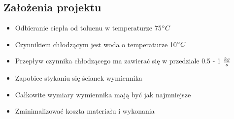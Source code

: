 \subsection{Założenia projektu}
\begin{itemize}
    \item Odbieranie ciepła od toluenu w temperaturze 75\(^\circ C\)
    \item Czynnikiem chłodzącym jest woda o temperaturze 10\(^\circ C\)
    \item Przepływ czynnika chłodzącego ma zawierać się w przedziale 0.5 - 1 \(\frac{kg}{s}\)
    \item Zapobiec stykaniu się ścianek wymiennika
    \item Całkowite wymiary wymiennika mają być jak najmniejsze
    \item Zminimalizować koszta materiału i wykonania
\end{itemize}